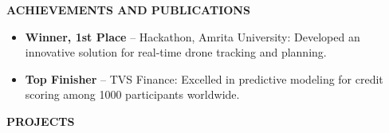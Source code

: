 \documentclass[10pt,a4]{article}
\begin{document}
{\begin{flushleft}
    {\Large \textbf{ACHIEVEMENTS AND PUBLICATIONS}}
      \begin{itemize}
            \item \textbf{Winner, 1st Place} – Hackathon, Amrita University: Developed an innovative solution for real-time drone tracking and planning.
            \item \textbf{Top Finisher} – TVS Finance: Excelled in predictive modeling for credit scoring among 1000 participants worldwide.
      \end{itemize}
\end{flushleft}

\begin{flushleft}
    {\Large \textbf{PROJECTS}}
        \vspace{0.5mm}
            
        


\end{flushleft}}
\end{document}
